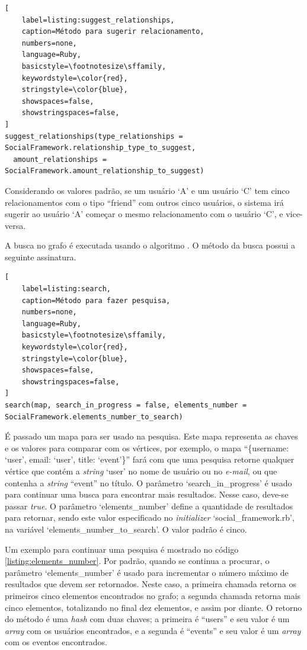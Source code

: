 \begin{lstlisting}[
    label=listing:suggest_relationships,
    caption=Método para sugerir relacionamento,
    numbers=none,
    language=Ruby,
    basicstyle=\footnotesize\sffamily,
    keywordstyle=\color{red},
    stringstyle=\color{blue},
    showspaces=false,
    showstringspaces=false,
]
suggest_relationships(type_relationships = SocialFramework.relationship_type_to_suggest,
  amount_relationships = SocialFramework.amount_relationship_to_suggest)
\end{lstlisting}

Considerando os valores padrão, se um usuário `A' e um usuário `C' tem cinco relacionamentos com o tipo  ``friend'' com outros cinco usuários, o sistema irá sugerir ao usuário `A' começar o mesmo relacionamento com o usuário `C', e vice-versa.

A busca no grafo é executada usando o algoritmo . O método da busca possui a seguinte assinatura.

\begin{lstlisting}[
    label=listing:search,
    caption=Método para fazer pesquisa,
    numbers=none,
    language=Ruby,
    basicstyle=\footnotesize\sffamily,
    keywordstyle=\color{red},
    stringstyle=\color{blue},
    showspaces=false,
    showstringspaces=false,
]
search(map, search_in_progress = false, elements_number = SocialFramework.elements_number_to_search)
\end{lstlisting}

É passado um mapa para ser usado na pesquisa. Este mapa representa as chaves e os valores para comparar com os vértices, por exemplo, o mapa ``\{username: `user', email: `user', title: `event'\}'' fará com que uma pesquisa retorne qualquer vértice que contém a \textit{string} `user' no nome de usuário ou no \textit{e-mail}, ou que contenha a \textit{string} ``event'' no título. O parâmetro `search\_in\_progress' é usado para continuar uma busca para encontrar mais resultados. Nesse caso, deve-se passar \textit{true}. O parâmetro `elements\_number' define a quantidade de resultados para retornar, sendo este valor especificado no \textit{initializer} `social\_framework.rb', na variável `elements\_number\_to\_search'. O valor padrão é cinco.

Um exemplo para continuar uma pesquisa é mostrado no código \ref{listing:elements_number}. Por padrão, quando se continua a procurar, o parâmetro `elements\_number' é usado para incrementar o número máximo de resultados que devem ser retornados. Neste caso, a primeira chamada retorna os primeiros cinco elementos encontrados no grafo; a segunda chamada retorna mais cinco elementos, totalizando no final dez elementos, e assim por diante. O retorno do método é uma \textit{hash} com duas chaves; a primeira é ``users'' e seu valor é um \textit{array} com os usuários encontrados, e a segunda é ``events'' e seu valor é um \textit{array} com os eventos encontrados.

